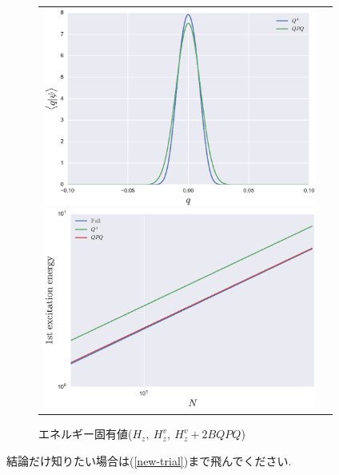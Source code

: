 \documentclass[10.5pt,a4paper]{jreport}
\begin{document}
\begin{figure}[H]
  \begin{tabular}{cc}
    \begin{minipage}{0.5\hsize}
      \begin{center}
        \includegraphics[width = 9cm]{./EPS/psi_qpq2.eps}
        \caption{固有関数の絶対値($H_z^v,\ H_z^v + 2BQPQ$)}\label{psi_qpq}
      \end{center}
    \end{minipage}
    \begin{minipage}{0.6\hsize}
      \begin{center}
        \includegraphics[width = 9cm]{./EPS/energy2.eps}
        \caption{エネルギー固有値($H_z,\ H_z^v,\ H_z^v + 2BQPQ$)}\label{energy}
      \end{center}
    \end{minipage}
  \end{tabular}
\end{figure}

結論だけ知りたい場合は(\ref{new-trial})まで飛んでください. 
\end{document}
